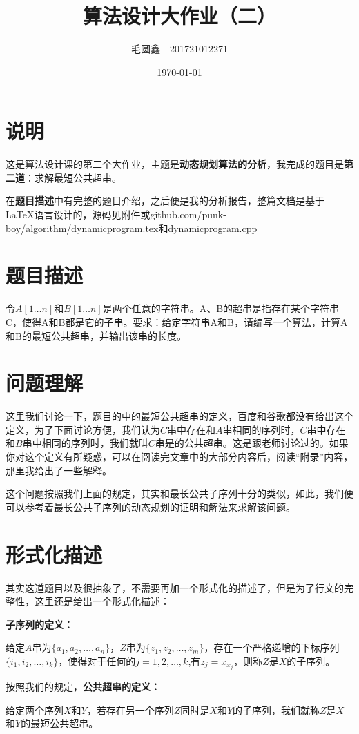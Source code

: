 \documentclass[11pt]{ctexart}
\title{\huge\bf
算法设计大作业（二）}
\author{毛圆鑫 - 201721012271}
\date{\today}
\begin{document}
\maketitle
\section*{说明}
这是算法设计课的第二个大作业，主题是\textbf{动态规划算法的分析}，我完成的题目是\textbf{第二道}：求解最短公共超串。

在\textbf{题目描述}中有完整的题目介绍，之后便是我的分析报告，整篇文档是基于 \LaTeX 语言设计的，源码见附件或github.com/punk-boy/algorithm/dynamicprogram.tex和dynamicprogram.cpp


\section{题目描述}
令$A[1\dots n]$和$B[1\dots n]$是两个任意的字符串。A、B的超串是指存在某个字符串C，使得A和B都是它的子串。要求：给定字符串A和B，请编写一个算法，计算A和B的最短公共超串，并输出该串的长度。

\section{问题理解}
这里我们讨论一下，题目的中的最短公共超串的定义，百度和谷歌都没有给出这个定义，为了下面讨论方便，我们认为$C$串中存在和$A$串相同的序列时，$C$串中存在和$B$串中相同的序列时，我们就叫$C$串是的公共超串。这是跟老师讨论过的。如果你对这个定义有所疑惑，可以在阅读完文章中的大部分内容后，阅读“附录”内容，那里我给出了一些解释。

这个问题按照我们上面的规定，其实和最长公共子序列十分的类似，如此，我们便可以参考着最长公共子序列的动态规划的证明和解法来求解该问题。

\section{形式化描述}
其实这道题目以及很抽象了，不需要再加一个形式化的描述了，但是为了行文的完整性，这里还是给出一个形式化描述：

\textbf{子序列的定义：}

给定$A$串为$\{a_1, a_2, \dots, a_n\}$，$Z$串为$\{z_1, z_2, \dots, z_m\}$，存在一个严格递增的下标序列$\{i_1,i_2,\dots,i_k\}$，使得对于任何的$j=1,2,\dots,k$,有$z_j=x_{x_j}$，则称$Z$是$X$的子序列。

按照我们的规定，\textbf{公共超串的定义：}

给定两个序列$X$和$Y$，若存在另一个序列$Z$同时是$X$和$Y$的子序列，我们就称$Z$是$X$和$Y$的最短公共超串。
\end{document}
